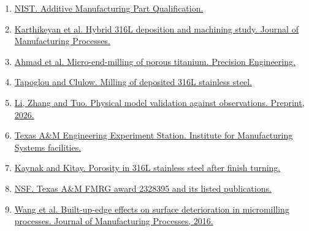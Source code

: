 \documentclass[11pt,letterpaper]{article}
\begin{document}
\begin{enumerate}
\small\setlength{\itemsep}{0pt}
\item \href{https://www.nist.gov/programs-projects/additive-manufacturing-part-qualification}{NIST. Additive Manufacturing Part Qualification.}
\item \href{https://doi.org/10.1016/j.jmapro.2025.10.080}{Karthikeyan et al. Hybrid 316L deposition and machining study. Journal of Manufacturing Processes.}
\item \href{https://doi.org/10.1016/j.precisioneng.2022.04.010}{Ahmad et al. Micro-end-milling of porous titanium. Precision Engineering.}
\item \href{https://doi.org/10.1177/0954405420949360}{Tapoglou and Clulow. Milling of deposited 316L stainless steel.}
\item \href{https://arxiv.org/abs/2604.17144}{Li, Zhang and Tuo. Physical model validation against observations. Preprint, 2026.}
\item \href{https://texasmakes.tamu.edu/facilities/}{Texas A\&M Engineering Experiment Station. Institute for Manufacturing Systems facilities.}
\item \href{https://doi.org/10.3390/jmmp2020036}{Kaynak and Kitay. Porosity in 316L stainless steel after finish turning.}
\item \href{https://www.nsf.gov/awardsearch/showAward?AWD_ID=2328395}{NSF. Texas A\&M FMRG award 2328395 and its listed publications.}
\item \href{https://doi.org/10.1016/j.jmapro.2016.03.016}{Wang et al. Built-up-edge effects on surface deterioration in micromilling processes. Journal of Manufacturing Processes, 2016.}
\end{enumerate}
\end{document}
